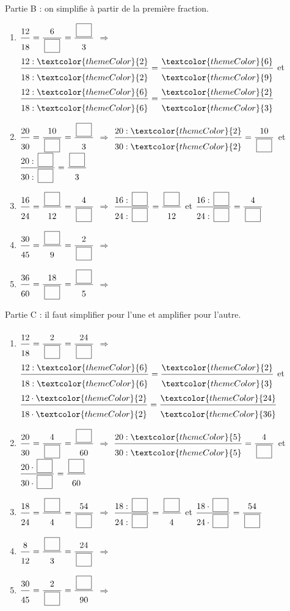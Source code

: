 \vfill
\textcolor{themeColor}{Partie B} : on simplifie à partir de la première fraction.

\begin{enumerate}[leftmargin=*,align=parleft, label=\alph*), itemsep=6pt, start=6]
\item $\FA{12}{18}=\FA{6}{\CaseC}=\FA{\CaseC}{3}$ \quad $\Longrightarrow$ \quad $\FA{12 : \textcolor{themeColor}{2}}{18 : \textcolor{themeColor}{2}}=\FA{\textcolor{themeColor}{6}}{\textcolor{themeColor}{9}}$ \quad et \quad $\FA{12 : \textcolor{themeColor}{6}}{18 : \textcolor{themeColor}{6}}=\FA{\textcolor{themeColor}{2}}{\textcolor{themeColor}{3}}$
\item $\FA{20}{30}=\FA{10}{\CaseC}=\FA{\CaseC}{3}$ \quad $\Longrightarrow$ \quad $\FA{20 : \textcolor{themeColor}{2}}{30 : \textcolor{themeColor}{2}}=\FA{10}{\CaseC}$ \quad et \quad $\FA{20 : \CaseC}{30 : \CaseC}=\FA{\CaseC}{3}$
\item $\FA{16}{24}=\FA{\CaseC}{12}=\FA{4}{\CaseC}$ \quad $\Longrightarrow$ \quad $\FA{16 : \CaseC}{24 : \CaseC}=\FA{\CaseC}{12}$ \quad et \quad $\FA{16 : \CaseC}{24 : \CaseC}=\FA{4}{\CaseC}$
\item $\FA{30}{45}=\FA{\CaseC}{9}=\FA{2}{\CaseC}$ \quad $\Longrightarrow$
\item $\FA{36}{60}=\FA{18}{\CaseC}=\FA{\CaseC}{5}$ \quad $\Longrightarrow$
\end{enumerate}

\newpage
\textcolor{themeColor}{Partie C} : il faut simplifier pour l'une et amplifier pour l'autre.

\begin{enumerate}[leftmargin=*,align=parleft, label=\alph*), itemsep=6pt, start=11]
\item $\FA{12}{18}=\FA{2}{\CaseC}=\FA{24}{\CaseC}$ \quad $\Longrightarrow$ \quad $\FA{12 : \textcolor{themeColor}{6}}{18 : \textcolor{themeColor}{6}}=\FA{\textcolor{themeColor}{2}}{\textcolor{themeColor}{3}}$ \quad et \quad $\FA{12 \cdot \textcolor{themeColor}{2}}{18 \cdot \textcolor{themeColor}{2}}=\FA{\textcolor{themeColor}{24}}{\textcolor{themeColor}{36}}$
\item $\FA{20}{30}=\FA{4}{\CaseC}=\FA{\CaseC}{60}$ \quad $\Longrightarrow$ \quad $\FA{20 : \textcolor{themeColor}{5}}{30 : \textcolor{themeColor}{5}}=\FA{4}{\CaseC}$ \quad et \quad $\FA{20 \cdot \CaseC}{30 \cdot \CaseC}=\FA{\CaseC}{60}$
\item $\FA{18}{24}=\FA{\CaseC}{4}=\FA{54}{\CaseC}$ \quad $\Longrightarrow$ \quad $\FA{18 : \CaseC}{24 : \CaseC}=\FA{\CaseC}{4}$ \quad et \quad $\FA{18 \cdot \CaseC}{24 \cdot \CaseC}=\FA{54}{\CaseC}$
\item $\FA{8}{12}=\FA{\CaseC}{3}=\FA{24}{\CaseC}$ \quad $\Longrightarrow$
\item $\FA{30}{45}=\FA{2}{\CaseC}=\FA{\CaseC}{90}$ \quad $\Longrightarrow$
\end{enumerate}

